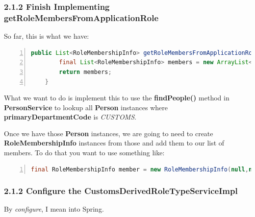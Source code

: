 \subsubsection*{2.1.2 Finish Implementing
  getRoleMembersFromApplicationRole}
So far, this is what we have:
\begin{lstlisting}[numbers=left,language=java,basicstyle=\scriptsize,backgroundcolor=\color{ubergray},caption={Stubbed
  customsDerivedRoleTypeServiceImpl.java},frame=single,breaklines=true]
    public List<RoleMembershipInfo> getRoleMembersFromApplicationRole(String namespaceCode, String roleName, AttributeSet qualification) {
        final List<RoleMembershipInfo> members = new ArrayList<RoleMembershipInfo>();
        return members;
    }
\end{lstlisting}

What we want to do is implement this to use the \textbf{findPeople()}
method in \textbf{PersonService}
to lookup all \textbf{Person} instances where
\textbf{primaryDepartmentCode} is \emph{CUSTOMS}.

Once we have those \textbf{Person} instances, we are going to need to
create \textbf{RoleMembershipInfo} instances from those and add them
to our list of members. To do that you want to use something like:

\begin{lstlisting}[numbers=left,language=java,basicstyle=\scriptsize,backgroundcolor=\color{ubergray},caption={New
  RoleMembershipInfo snippet},frame=single,breaklines=true]
final RoleMembershipInfo member = new RoleMembershipInfo(null,null,person.getPrincipalId(),Role.PRINCIPAL_MEMBER_TYPE,null) 
\end{lstlisting}

\subsubsection*{2.1.2 Configure the CustomsDerivedRoleTypeServiceImpl}
By \emph{configure}, I mean into Spring.

